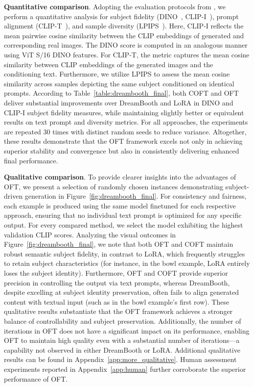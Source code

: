 {\textbf{Quantitative comparison}. Adopting the evaluation protocols from \cite{ruiz2023dreambooth}, we perform a quantitative analysis for subject fidelity (DINO~\cite{caron2021emerging}, CLIP-I~\cite{radford2021learning}), prompt alignment (CLIP-T~\cite{radford2021learning}), and sample diversity (LPIPS~\cite{zhang2018unreasonable}). Here, CLIP-I reflects the mean pairwise cosine similarity between the CLIP embeddings of generated and corresponding real images. The DINO score is computed in an analogous manner using ViT S/16 DINO features. For CLIP-T, the metric captures the mean cosine similarity between CLIP embeddings of the generated images and the conditioning text. Furthermore, we utilize LPIPS to assess the mean cosine similarity across samples depicting the same subject conditioned on identical prompts. According to Table~\ref{table:dreambooth_final}, both COFT and OFT deliver substantial improvements over DreamBooth and LoRA in DINO and CLIP-I subject fidelity measures, while maintaining slightly better or equivalent results on text prompt and diversity metrics. For all approaches, the experiments are repeated 30 times with distinct random seeds to reduce variance. Altogether, these results demonstrate that the OFT framework excels not only in achieving superior stability and convergence but also in consistently delivering enhanced final performance.

\textbf{Qualitative comparison}. To provide clearer insights into the advantages of OFT, we present a selection of randomly chosen instances demonstrating subject-driven generation in Figure~\ref{fig:dreambooth_final}. For consistency and fairness, each example is produced using the same model finetuned for each respective approach, ensuring that no individual text prompt is optimized for any specific output. For every compared method, we select the model exhibiting the highest validation CLIP scores. Analyzing the visual outcomes in Figure~\ref{fig:dreambooth_final}, we note that both OFT and COFT maintain robust semantic subject fidelity, in contrast to LoRA, which frequently struggles to retain subject characteristics (for instance, in the bowl example, LoRA entirely loses the subject identity). Furthermore, OFT and COFT provide superior precision in controlling the output via text prompts, whereas DreamBooth, despite excelling at subject identity preservation, often fails to align generated content with textual input (such as in the bowl example’s first row). These qualitative results substantiate that the OFT framework achieves a stronger balance of controllability and subject preservation. Additionally, the number of iterations in OFT does not have a significant impact on its performance, enabling OFT to maintain high quality even with a substantial number of iterations—a capability not observed in either DreamBooth or LoRA. Additional qualitative results can be found in Appendix~\ref{app:more_qualitative}. Human assessment experiments reported in Appendix~\ref{app:human} further corroborate the superior performance of OFT.

}
